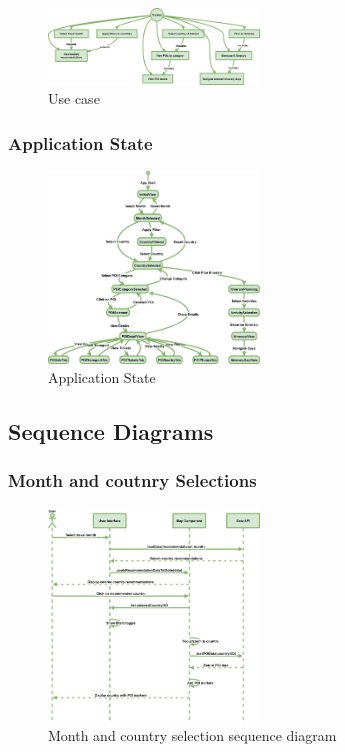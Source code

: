 \documentclass[]{project_final}
\begin{document}
\begin{figure}[ht!]
    \centering
    \includegraphics[width=0.5\textwidth]{TPUseCase.png}
    \vspace*{0.0cm}
    \caption{Use case}
    \label{fig:1}
\end{figure}
\newpage
\subsubsection{Application State}

\begin{figure}[ht!]
    \centering
    \includegraphics[width=0.5\textwidth]{TPApplicationState.png}
    \vspace*{0.0cm}
    \caption{Application State}
    \label{fig:1}
\end{figure}
\newpage
\subsection{Sequence Diagrams}
\subsubsection{Month and coutnry Selections}

\begin{figure}[ht!]
    \centering
    \includegraphics[width=0.5\textwidth]{MonthandcountryselectionsSequence.png}
    \vspace*{0.0cm}
    \caption{Month and country selection sequence diagram}
    \label{fig:1}
\end{figure}
\newpage
\end{document}
